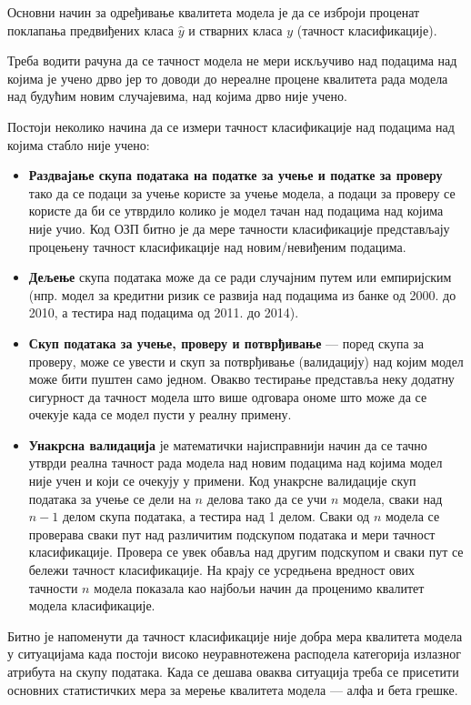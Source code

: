 Основни начин за одређивање квалитета модела је да се изброји проценат поклапања предвиђених класа $\hat{y}$ и стварних класа $y$ (тачност класификације).

Треба водити рачуна да се тачност модела не мери искључиво над подацима над којима је учено дрво јер то доводи до нереалне процене квалитета рада модела над будућим новим случајевима, над којима дрво није учено.

Постоји неколико начина да се измери тачност класификације над подацима над којима стабло није учено:

\begin{itemize}
  \item \textbf{Раздвајање скупа података на податке за учење и податке за проверу} тако да се подаци за учење користе за учење модела, а подаци за проверу се користе да би се утврдило колико је модел тачан над подацима над којима није учио. Код ОЗП битно је да мере тачности класификације представљају процењену тачност класификације над новим/невиђеним подацима.
  \item \textbf{Дељење} скупа података може да се ради случајним путем или емпиријским (нпр. модел за кредитни ризик се развија над подацима из банке од 2000. до 2010, а тестира над подацима од 2011. до 2014).
  \item \textbf{Скуп података за учење, проверу и потврђивање} — поред скупа за проверу, може се увести и скуп за потврђивање (валидацију) над којим модел може бити пуштен само једном. Овакво тестирање представља неку додатну сигурност да тачност модела што више одговара ономе што може да се очекује када се модел пусти у реалну примену.
  \item \textbf{Унакрсна валидација} је математички најисправнији начин да се тачно утврди реална тачност рада модела над новим подацима над којима модел није учен и који се очекују у примени. Код унакрсне валидације скуп података за учење се дели на $n$ делова тако да се учи $n$ модела, сваки над $n - 1$ делом скупа података, а тестира над 1 делом. Сваки од $n$ модела се проверава сваки пут над различитим подскупом података и мери тачност класификације. Провера се увек обавља над другим подскупом и сваки пут се бележи тачност класификације. На крају се усредњена вредност ових тачности $n$ модела показала као најбољи начин да проценимо квалитет модела класификације.
\end{itemize}
Битно је напоменути да тачност класификације није добра мера квалитета модела у ситуацијама када постоји високо неуравнотежена расподела категорија излазног атрибута на скупу података. Када се дешава оваква ситуација треба се присетити основних статистичких мера за мерење квалитета модела — алфа и бета грешке.

